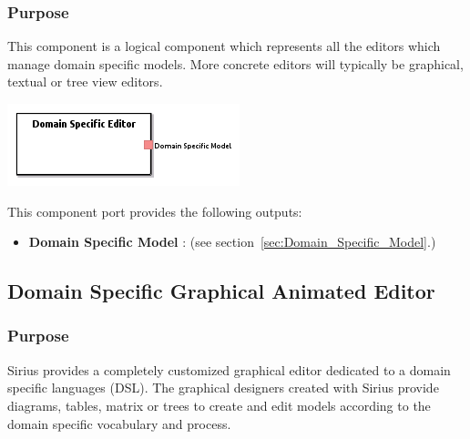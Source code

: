 \documentclass{gemoc} %
\begin{document}

\subsubsection{Purpose}
This component is a logical component which represents all the editors which manage domain specific models. More concrete editors will typically be graphical, textual or tree view editors.

\begin{center}
\includegraphics*[trim=0.0cm 0.0cm 0cm 0.0cm, clip=true]{../images/generated/Generated_Domain_Specific_Editor.png}
\end{center}


This component port provides the following outputs:
\begin{itemize}
  \item \textbf{Domain Specific Model} :
(see section~\ref{sec:Domain_Specific_Model}.)
\end{itemize}


\subsection{Domain Specific Graphical Animated Editor}
\label{sec:Domain_Specific_Graphical_Animated_Editor}


\subsubsection{Purpose}
Sirius provides a completely customized graphical editor dedicated to a domain specific languages (DSL). The graphical designers created with Sirius
provide diagrams, tables, matrix or trees to create and edit models according to the domain specific vocabulary and process.
\end{document}
